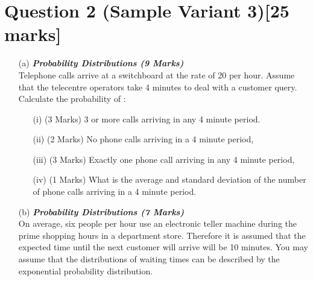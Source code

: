 \documentclass[]{article}
\begin{document}
\section*{Question 2 (Sample Variant 3)[25 marks]}
\begin{itemize}

\item[(a)] \textbf{\textit{Probability Distributions (9 Marks)}}\\
Telephone calls arrive at a switchboard at the rate of 20 per hour.  Assume that the telecentre operators take 4 minutes to deal with a customer query.  Calculate the probability of :
\begin{itemize} 
\item[(i)] (3 Marks)                 3 or more calls arriving in any 4 minute period.
\item[(ii)] (2 Marks)               No phone calls arriving in a 4 minute period,
\item[(iii)] (3 Marks)              Exactly one phone call arriving in any 4 minute period,
\item[(iv)] (1 Marks)             What is the average and standard deviation of the number of phone calls arriving in a 4 minute period.
\end{itemize}


\bigskip
\item[(b)] \textbf{\textit{Probability Distributions (7 Marks)}}\\ On average, six people per hour use an electronic teller machine during the prime shopping hours in a department store. Therefore it is assumed that the expected time until the next customer will arrive will be 10 minutes. You may assume that the distributions of waiting times can be described by the exponential probability distribution.


\end{itemize}
\end{document}
